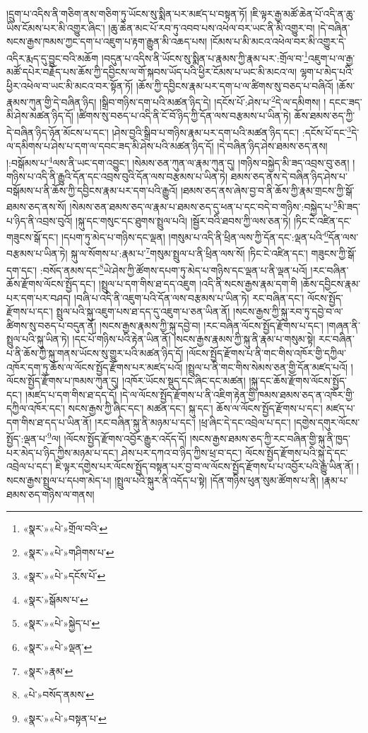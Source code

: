 །དྲུག་པ་འདིས་ནི་གཅིག་ནས་གཅིག་ཏུ་ཡོངས་སུ་སྨིན་པར་མཛད་པ་བསྟན་ཏོ། །ཇི་ལྟར་རྒྱ་མཚོ་ཆེན་པོ་འདི་ན་ཆུ་ཡིས་ངོམས་པར་མི་འགྱུར་ཞིང་། །ཆུ་ཆེན་མང་པོ་རབ་ཏུ་འབབ་པས་འཕེལ་བར་ཡང་ནི་མི་འགྱུར་བ། །དེ་བཞིན་སངས་རྒྱས་ཁམས་ཀྱང་དག་པ་འཇུག་པ་རྟག་རྒྱུན་མི་འཆད་པས། །ངོམས་པ་མི་མངའ་འཕེལ་བར་མི་འགྱུར་དེ་འདིར་རྨད་དུ་བྱུང་བའི་མཆོག །བདུན་པ་འདིས་ནི་ཡོངས་སུ་སྨིན་པ་རྣམས་ཀྱི་རྣམ་པར་:གྲོལ་བ་\footnote{«སྣར་»«པེ་»གྲོལ་བའི་}འཇུག་པ་ལ་རྒྱ་མཚོ་དཔེར་བརྗོད་པས་ཆོས་ཀྱི་དབྱིངས་ལ་གོ་སྐབས་ཡོད་པའི་ཕྱིར་ངོམས་པ་ཡང་མི་མངའ་ལ། ལྷག་པ་མེད་པའི་ཕྱིར་འཕེལ་བ་ཡང་མི་མངའ་བར་སྟོན་ཏོ། །ཆོས་ཀྱི་དབྱིངས་རྣམ་པར་དག་པ་ལ་ཚིགས་སུ་བཅད་པ་བཞིའོ། །ཆོས་རྣམས་ཀུན་གྱི་དེ་བཞིན་ཉིད། །སྒྲིབ་གཉིས་དག་པའི་མཚན་ཉིད་དེ། །དངོས་པོ་:ཤེས་པ་\footnote{«སྣར་»«པེ་»གཤིགས་པ་}དེ་ལ་དམིགས། །
དངང་ཟད་མི་ཤེས་མཚན་ཉིད་དོ། །ཚིགས་སུ་བཅད་པ་འདི་ནི་ངོ་བོ་ཉིད་ཀྱི་དོན་ལས་བརྩམས་པ་ཡིན་ཏེ། ཆོས་ཐམས་ཅད་ཀྱི་དེ་བཞིན་ཉིད་ཉོན་མོངས་པ་དང་། །ཤེས་བྱའི་སྒྲིབ་པ་གཉིས་རྣམ་པར་དག་པའི་མཚན་ཉིད་དང་། :དངོས་པོ་དང་\footnote{«སྣར་»«པེ་»དངོས་པོ་}དེ་ལ་དམིགས་པ་ཤེས་པ་དག་ལ་དབང་ཟད་མི་ཤེས་པའི་མཚན་ཉིད་དོ། །དེ་བཞིན་ཉིད་ཤེས་ཐམས་ཅད་ནས། །:བསྒོམས་པ་\footnote{«སྣར་»སྒོམས་པ་}ལས་ནི་ཡང་དག་འབྱུང་། །སེམས་ཅན་ཀུན་ལ་རྣམ་ཀུན་དུ། །གཉིས་བསྐྱེད་མི་ཟད་འབྲས་བུ་ཅན། །གཉིས་པ་འདི་ནི་རྒྱུའི་དོན་དང་འབྲས་བུའི་དོན་ལས་བརྩམས་པ་ཡིན་ཏེ། ཐམས་ཅད་ནས་དེ་བཞིན་ཉིད་ཤེས་པ་བསྒོམས་པ་ནི་ཆོས་ཀྱི་དབྱིངས་རྣམ་པར་དག་པའི་རྒྱུའོ། །ཐམས་ཅད་ནས་ཞེས་བྱ་བ་ནི་ཆོས་ཀྱི་རྣམ་གྲངས་ཀྱི་སྒོ་ཐམས་ཅད་ནས་སོ། །སེམས་ཅན་ཐམས་ཅད་ལ་རྣམ་པ་ཐམས་ཅད་དུ་ཕན་པ་དང་བདེ་བ་གཉིས་:བསྐྱེད་པ་\footnote{«སྣར་»«པེ་»སྐྱེད་པ་}མི་ཟད་པ་ཉིད་ནི་འབྲས་བུའོ། །སྐུ་དང་གསུང་དང་ཐུགས་སྤྲུལ་པའི། །སྦྱོར་བའི་ཐབས་ཀྱི་ལས་ཅན་ཏེ། །ཏིང་ངེ་འཛིན་དང་གཟུངས་སྒོ་དང་། །དཔག་ཏུ་མེད་པ་གཉིས་དང་ལྡན། །གསུམ་པ་འདི་ནི་ཕྲིན་ལས་ཀྱི་དོན་དང་:ལྡན་པའི་\footnote{«སྣར་»«པེ་»ལྡན་}དོན་ལས་བརྩམས་པ་ཡིན་ཏེ། སྐུ་ལ་སོགས་པ་:རྣམ་པ་\footnote{«སྣར་»རྣམ་}གསུམ་སྤྲུལ་པ་ནི་ཕྲིན་ལས་སོ། །ཏིང་ངེ་འཛིན་དང་། གཟུངས་ཀྱི་སྒོ་དག་དང་། :བསོད་ནམས་དང་\footnote{«པེ་»བསོད་ནམས་}ཡེ་ཤེས་ཀྱི་ཚོགས་དཔག་ཏུ་མེད་པ་གཉིས་དང་ལྡན་པ་ནི་ལྡན་པའོ། །རང་བཞིན་ཆོས་རྫོགས་ལོངས་སྤྱོད་དང་། །སྤྲུལ་པ་དག་གིས་ཐ་དད་འཇུག །འདི་ནི་སངས་རྒྱས་རྣམ་དག་གི །ཆོས་དབྱིངས་རྣམ་པར་དག་པར་བཤད། །བཞི་པ་འདི་ནི་འཇུག་པའི་དོན་ལས་བརྩམས་པ་ཡིན་ཏེ། རང་བཞིན་དང་། ལོངས་སྤྱོད་རྫོགས་པ་དང་། སྤྲུལ་པའི་སྐུ་འཇུག་པས་ཐ་དད་དུ་འཇུག་པ་ཅན་ཡིན་ནོ། །སངས་རྒྱས་ཀྱི་སྐུ་རབ་ཏུ་དབྱེ་བ་ལ་ཚིགས་སུ་བཅད་པ་བདུན་ནོ། །སངས་རྒྱས་རྣམས་ཀྱི་སྐུ་དབྱེ་བ། །རང་བཞིན་ལོངས་སྤྱོད་རྫོགས་པ་དང་། །གཞན་ནི་སྤྲུལ་པའི་སྐུ་ཡིན་ཏེ། །དང་པོ་གཉིས་པའི་རྟེན་ཡིན་ནོ། །སངས་རྒྱས་རྣམས་ཀྱི་སྐུ་ནི་རྣམ་པ་གསུམ་སྟེ། རང་བཞིན་པ་ནི་ཆོས་ཀྱི་སྐུ་གནས་ཡོངས་སུ་གྱུར་པའི་མཚན་ཉིད་དོ། །ལོངས་སྤྱོད་རྫོགས་པ་ནི་གང་གིས་འཁོར་གྱི་དཀྱིལ་འཁོར་དག་ཏུ་ཆོས་ལ་ལོངས་སྤྱོད་རྫོགས་པར་མཛད་པའོ། །སྤྲུལ་པ་ནི་གང་གིས་སེམས་ཅན་གྱི་དོན་མཛད་པའོ། །ལོངས་སྤྱོད་རྫོགས་པ་ཁམས་ཀུན་དུ། །འཁོར་ཡོངས་སྡུད་དང་ཞིང་དང་མཚན། །སྐུ་དང་ཆོས་རྫོགས་ལོངས་སྤྱོད་དང་། །མཛད་པ་དག་གིས་ཐ་དད་དོ། །དེ་ལ་ལོངས་སྤྱོད་རྫོགས་པ་ནི་འཇིག་རྟེན་གྱི་ཁམས་ཐམས་ཅད་ན་འཁོར་གྱི་དཀྱིལ་འཁོར་དང་། སངས་རྒྱས་ཀྱི་ཞིང་དང་། མཚན་དང་། སྐུ་དང་། ཆོས་ལ་ལོངས་སྤྱོད་རྫོགས་པ་དང་། མཛད་པ་དག་གིས་ཐ་དད་པ་ཡིན་ནོ། །རང་བཞིན་སྐུ་ནི་མཉམ་པ་དང་། །ཕྲ་ཞིང་དེ་དང་འབྲེལ་པ་དང་། །དགྱེས་དགུར་ལོངས་སྤྱོད་:ལྡན་པ་\footnote{«སྣར་»«པེ་»བསྟན་པ་}ལ། །ལོངས་སྤྱོད་རྫོགས་འབྱོར་རྒྱུར་འདོད་དོ། །སངས་རྒྱས་ཐམས་ཅད་ཀྱི་རང་བཞིན་གྱི་སྐུ་ནི་ཁྱད་པར་མེད་པ་ཉིད་ཀྱིས་མཉམ་པ་དང་། ཤེས་པར་དཀའ་བ་ཉིད་ཀྱིས་ཕྲ་བ་དང་། ལོངས་སྤྱོད་རྫོགས་པའི་སྐུ་དེ་དང་འབྲེལ་པ་དང་། ཇི་ལྟར་དགྱེས་པར་ལོངས་སྤྱོད་བསྟན་པར་བྱ་བ་ལ་ལོངས་སྤྱོད་རྫོགས་པ་པ་འབྱོར་པའི་རྒྱུ་ཡིན་ནོ། །སངས་རྒྱས་སྤྲུལ་པ་དཔག་མེད་པ། །སྤྲུལ་པའི་སྐུར་ནི་འདོད་པ་སྟེ། །དོན་གཉིས་ཕུན་སུམ་ཚོགས་པ་ནི། །རྣམ་པ་ཐམས་ཅད་གཉིས་ལ་གནས། 